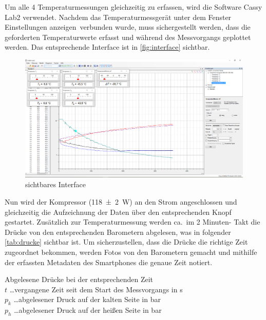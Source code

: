 \documentclass[12pt,english,ngerman]{scrartcl}
\begin{document}
Um alle 4 Temperaturmessungen gleichzeitig zu erfassen, wird die Software Cassy
Lab2 verwendet. Nachdem das Temperaturmessgerät unter dem Fenster \dq
Einstellungen anzeigen\dq \ verbunden wurde, muss sichergestellt werden, dass
die geforderten Temperaturwerte erfasst und während des Messvorgangs geplottet
werden. Das entsprechende Interface ist in \autoref{fig:interface} sichtbar.
\begin{figure}[H]
	\begin{center}
		\includegraphics[width =\textwidth]{./figures/interface.PNG}
	\end{center}
	\caption{sichtbares Interface
	}\label{fig:interface}
\end{figure}

Nun wird der Kompressor (\SI{118(2)}{\watt}) an den Strom angeschlossen und
gleichzeitig die Aufzeichnung der Daten über den entsprechenden Knopf
gestartet. Zusätzlich zur Temperaturmessung werden ca.\ im 2 Minuten- Takt die
Drücke von den entsprechenden Barometern abgelesen, was in folgender
\autoref{tab:drucke} sichtbar ist. Um sicherzustellen, dass die Drücke die
richtige Zeit zugeordnet bekommen, werden Fotos von den Barometern gemacht und
mithilfe der erfassten Metadaten des Smartphones die genaue Zeit notiert.

\begin{table}[H]
	\caption[Abgelesene Drücke bei der entsprechenden Zeit]{Abgelesene Drücke bei der
		entsprechenden Zeit                                            \\
		$t$ \dots vergangene Zeit seit dem Start des Messvorgangs in s \\
		$p_k$ \dots abgelesener Druck auf der kalten Seite in bar      \\
		$p_h$ \dots abgelesener Druck auf der heißen Seite in bar
	}\label{tab:drucke}
	\centering
	
\end{table}
\end{document}

